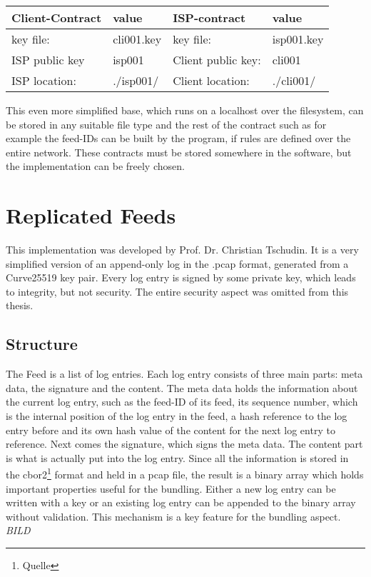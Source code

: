 \begin{center}  
    \begin{tabular}{llll} \toprule
        Client-Contract&value&ISP-contract&value\\ \midrule
        key file:& cli001.key &  key file: &isp001.key  \\ 
        ISP public key&isp001&Client public key:&cli001\\
        ISP location:&.\slash isp001\slash &Client location:& .\slash cli001\slash \\\bottomrule
    \end{tabular}  
\end{center}
This even more simplified base, which runs on a localhost over the filesystem, can be stored in any suitable file type and the rest of the contract such as for example the feed-IDs can be built by the program, if rules are defined over the entire network. These contracts must be stored somewhere in the software, but the implementation can be freely chosen.

\section{Replicated Feeds}
This implementation was developed by Prof. Dr. Christian Tschudin. It is a very simplified version of an append-only log in the .pcap format, generated from a Curve25519 key pair. Every log entry is signed by some private key, which leads to integrity, but not security. The entire security aspect was omitted from this thesis.
\subsection{Structure}
The Feed is a list of log entries. Each log entry consists of three main parts: meta data, the signature and the content. The meta data holds the information about the current log entry, such as the feed-ID of its feed, its sequence number, which is the internal position of the log entry in the feed, a hash reference to the log entry before and its own hash value of the content for the next log entry to reference. Next comes the signature, which signs the meta data. The content part is what is actually put into the log entry. Since all the information is stored in the cbor2\footnote{Quelle} format and held in a pcap file, the result is a binary array which holds important properties useful for the bundling. Either a new log entry can be written with a key or an existing log entry can be appended to the binary array without validation. This mechanism is a key feature for the bundling aspect.
\textit{BILD}
